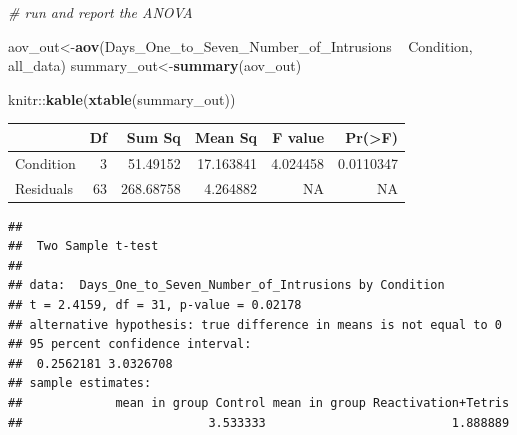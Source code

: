 \documentclass[]{book}
\newenvironment{Shaded}{\begin{snugshade}}{\end{snugshade}}
\newcommand{\KeywordTok}[1]{\textcolor[rgb]{0.13,0.29,0.53}{\textbf{{#1}}}}
\newcommand{\DataTypeTok}[1]{\textcolor[rgb]{0.13,0.29,0.53}{{#1}}}
\newcommand{\StringTok}[1]{\textcolor[rgb]{0.31,0.60,0.02}{{#1}}}
\newcommand{\CommentTok}[1]{\textcolor[rgb]{0.56,0.35,0.01}{\textit{{#1}}}}
\newcommand{\OtherTok}[1]{\textcolor[rgb]{0.56,0.35,0.01}{{#1}}}
\newcommand{\NormalTok}[1]{{#1}}
\theoremstyle{definition}
\theoremstyle{definition}
\theoremstyle{definition}
\theoremstyle{remark}
\begin{document}
\begin{Shaded}
\begin{Highlighting}[]
\CommentTok{# run and report the ANOVA}

\NormalTok{aov_out<-}\KeywordTok{aov}\NormalTok{(Days_One_to_Seven_Number_of_Intrusions ~}\StringTok{ }\NormalTok{Condition, all_data)}
\NormalTok{summary_out<-}\KeywordTok{summary}\NormalTok{(aov_out)}

\NormalTok{knitr::}\KeywordTok{kable}\NormalTok{(}\KeywordTok{xtable}\NormalTok{(summary_out))}
\end{Highlighting}
\end{Shaded}

\begin{tabular}{l|r|r|r|r|r}
\hline
  & Df & Sum Sq & Mean Sq & F value & Pr(>F)\\
\hline
Condition & 3 & 51.49152 & 17.163841 & 4.024458 & 0.0110347\\
\hline
Residuals & 63 & 268.68758 & 4.264882 & NA & NA\\
\hline
\end{tabular}

\begin{Shaded}
\end{Shaded}

\begin{verbatim}
## 
##  Two Sample t-test
## 
## data:  Days_One_to_Seven_Number_of_Intrusions by Condition
## t = 2.4159, df = 31, p-value = 0.02178
## alternative hypothesis: true difference in means is not equal to 0
## 95 percent confidence interval:
##  0.2562181 3.0326708
## sample estimates:
##             mean in group Control mean in group Reactivation+Tetris 
##                          3.533333                          1.888889
\end{verbatim}
\end{document}
